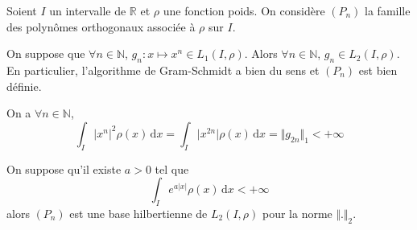 


	
	
	
	Soient $I$ un intervalle de $\mathbb{R}$ et $\rho$ une fonction poids. On considère $(P_n)$ la famille des polynômes orthogonaux associée à $\rho$ sur $I$.
	
	\begin{lemma}
		\label{densite-polynomes-orthogonaux-1}
		On suppose que $\forall n \in \mathbb{N}$, $g_n : x \mapsto x^n \in L_1(I, \rho)$. Alors $\forall n \in \mathbb{N}$, $g_n \in L_2(I, \rho)$. En particulier, l'algorithme de Gram-Schmidt a bien du sens et $(P_n)$ est bien définie.
	\end{lemma}
	
	\begin{demonstration}
		On a $\forall n \in \mathbb{N}$,
		\[ \int_I \vert x^n \vert^2 \rho(x) \, \mathrm{d}x = \int_I \vert x^{2n} \vert \rho(x) \, \mathrm{d}x = \Vert g_{2n} \Vert_1 < +\infty \]
	\end{demonstration}
	
	\begin{theorem}
		On suppose qu'il existe $a > 0$ tel que
		\[ \int_I e^{a \vert x \vert} \rho(x) \, \mathrm{d}x < +\infty \]
		alors $(P_n)$ est une base hilbertienne de $L_2(I, \rho)$ pour la norme $\Vert . \Vert_2$.
	\end{theorem}
	
